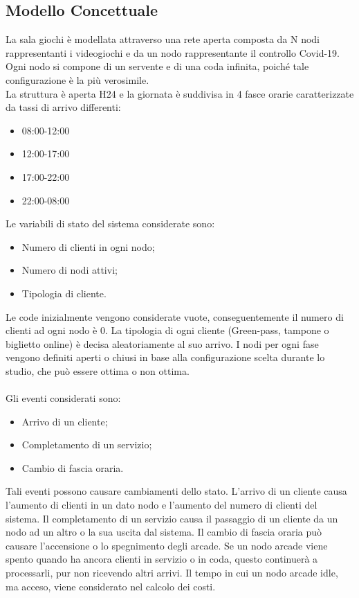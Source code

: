 \documentclass{article}
\begin{document}
\subsection{Modello Concettuale}
La sala giochi è modellata attraverso una rete aperta composta da N nodi rappresentanti i videogiochi e da un nodo rappresentante il controllo Covid-19. Ogni nodo si compone di un servente e di una coda infinita, poiché tale configurazione è la più verosimile.
\\
La struttura è aperta H24 e la giornata è suddivisa in 4 fasce orarie caratterizzate da tassi di arrivo differenti:
\begin{itemize}
\item 08:00-12:00
\item 12:00-17:00
\item 17:00-22:00
\item 22:00-08:00



\end{itemize}
Le variabili di stato del sistema considerate sono:
\begin{itemize}
\item Numero di clienti in ogni nodo;
\item Numero di nodi attivi;
\item Tipologia di cliente.
\end{itemize}
Le code inizialmente vengono considerate vuote, conseguentemente il numero di
clienti ad ogni nodo è 0. La tipologia di ogni cliente (Green-pass, tampone o biglietto online) è decisa aleatoriamente al suo arrivo. I nodi per ogni fase vengono definiti aperti o chiusi in base alla configurazione scelta durante lo studio, che può essere ottima o non
ottima.
\\ \\
Gli eventi considerati sono:
\begin{itemize}
\item Arrivo di un cliente;
\item Completamento di un servizio;
\item Cambio di fascia oraria.
\end{itemize}
Tali eventi possono causare cambiamenti dello stato. L’arrivo di un cliente causa
l’aumento di clienti in un dato nodo e l’aumento del numero di clienti del sistema. Il completamento di un servizio causa il passaggio di un cliente da un
nodo ad un altro o la sua uscita dal sistema. Il cambio di fascia oraria può causare
l’accensione o lo spegnimento degli arcade. Se un nodo arcade viene spento quando ha ancora
clienti in servizio o in coda, questo continuerà a processarli, pur non ricevendo altri
arrivi. Il tempo in cui un nodo arcade idle, ma acceso, viene considerato nel calcolo dei
costi.
\end{document}
